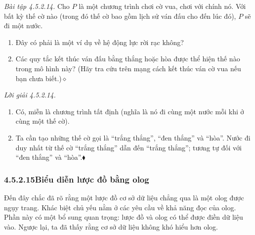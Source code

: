 \noindent\textit{Bài tập 4.5.2.14.}\keepwithnext
Cho $P$ là một chương trình chơi cờ vua, chơi với chính nó. Với bất kỳ thế cờ nào (trong đó thế cờ bao gồm lịch sử ván đấu cho đến lúc đó), $P$ sẽ đi một nước.
\begin{enumerate}[label=\alph*.]
\item Đây có phải là một ví dụ về hệ động lực rời rạc không?
\item Các quy tắc kết thúc ván đấu bằng thắng hoặc hòa được thể hiện thế nào trong mô hình này? (Hãy tra cứu trên mạng cách kết thúc ván cờ vua nếu bạn chưa biết.)\nobreak\hfill$\diamond$
\end{enumerate}

\noindent\textit{Lời giải 4.5.2.14.}\keepwithnext
\begin{enumerate}[label=\alph*.]
\item Có, miễn là chương trình tất định (nghĩa là nó đi cùng một nước mỗi khi ở cùng một thế cờ).
\item Ta cần tạo những thế cờ gọi là ``trắng thắng'', ``đen thắng'' và ``hòa''. Nước đi duy nhất từ thế cờ ``trắng thắng'' dẫn đến ``trắng thắng''; tương tự đối với ``đen thắng'' và ``hòa''.\nobreak\hfill$\blacklozenge$
\end{enumerate}

\subsubsection*{4.5.2.15\quad Biểu diễn lược đồ bằng olog}

Đến đây chắc đã rõ rằng một lược đồ cơ sở dữ liệu chẳng qua là một olog được ngụy trang. Khác biệt chủ yếu nằm ở các yêu cầu về khả năng đọc của olog. Phần này có một bổ sung quan trọng: lược đồ và olog có thể được điền dữ liệu vào. Ngược lại, ta đã thấy rằng cơ sở dữ liệu không khó hiểu hơn olog.

